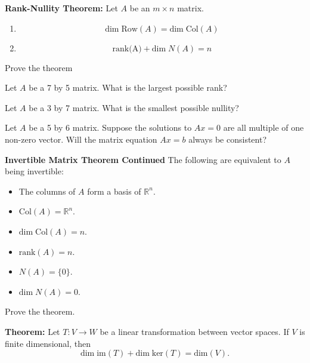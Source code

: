 \documentclass[12pt,letterpaper]{article}
\begin{document}
\begin{enumerate}
{\bf Rank-Nullity Theorem:} Let $A$ be an $m\times n$ matrix.
\begin{enumerate}
\item $$\text{dim} \;\text{Row}(A)= \text{dim} \;\text{Col}(A)$$
\item $$\text{rank(A)}+\text{dim} \;N(A) =n$$
\end{enumerate}

\Problem Prove the theorem

\vfill

\vfill

\vfill

\Problem 

\Part Let $A$ be a 7 by 5 matrix. What is the largest possible rank?

\vfill

\Part Let $A$ be a 3 by 7 matrix. What is the smallest possible nullity?

\vfill

\Part Let $A$ be a 5 by 6 matrix. Suppose the solutions to $Ax=0$ are all multiple of one non-zero vector. Will the matrix equation $Ax=b$ always be consistent?

\vfill

\newpage

{\bf Invertible Matrix Theorem Continued} The following are equivalent to $A$ being invertible:
\begin{itemize}
\item[m.] The columns of $A$ form a basis of $\mathbb{R}^n$.
\item[n.] $\text{Col}(A)=\mathbb{R}^n$.
\item[o.] $\text{dim} \; \text{Col}(A)=n$.
\item[p.] $\text{rank}(A)=n$.
\item[q.] $N(A)=\{0\}$.
\item[r.] $\text{dim}\; N(A) =0$.
\end{itemize}

\Problem Prove the theorem.

\vfill

{\bf Theorem:} Let $T: V \to W$ be a linear transformation between vector spaces. If $V$ is finite dimensional, then $$\text{dim} \; \text{im}(T) + \text{dim} \; \text{ker}(T) =\text{dim}(V).$$

\end{enumerate}
\end{document}

